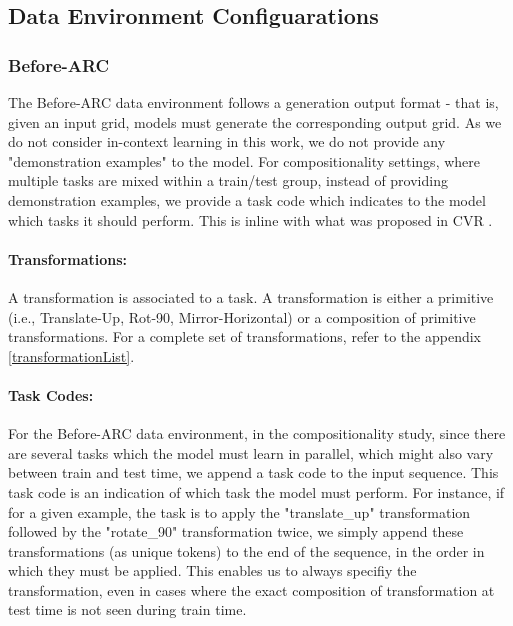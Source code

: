 \subsection{Data Environment Configuarations}

\subsubsection{Before-ARC}

The Before-ARC data environment follows a generation output format - that is, given an input grid, models must generate the corresponding output grid. As we do not consider in-context learning in this work, we do not provide any "demonstration examples" to the model. For compositionality settings, where multiple tasks are mixed within a train/test group, instead of providing demonstration examples, we provide a task code which indicates to the model which tasks it should perform. This is inline with what was proposed in CVR \cite{cvr2022}. 

\paragraph{Transformations:} A transformation is associated to a task. A transformation is either a primitive (i.e., Translate-Up, Rot-90, Mirror-Horizontal) or a composition of primitive transformations. For a complete set of transformations, refer to the appendix \ref{transformationList}. 

\paragraph{Task Codes:} 

For the Before-ARC data environment, in the compositionality study, since there are several tasks which the model must learn in parallel, which might also vary between train and test time, we append a task code to the input sequence. This task code is an indication of which task the model must perform. For instance, if for a given example, the task is to apply the "translate\_up" transformation followed by the "rotate\_90" transformation twice, we simply append these transformations (as unique tokens) to the end of the sequence, in the order in which they must be applied. This enables us to always specifiy the transformation, even in cases where the exact composition of transformation at test time is not seen during train time. 



